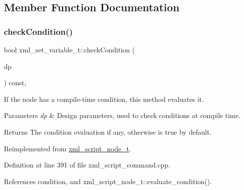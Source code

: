 \subsection{Member Function Documentation}
\mbox{\label{classxml__set__variable__t_a85442505ebbf8662f4791b94a52487d4}} 
\subsubsection{\texorpdfstring{check\+Condition()}{checkCondition()}}
{\footnotesize\ttfamily bool xml\+\_\+set\+\_\+variable\+\_\+t\+::check\+Condition (\begin{DoxyParamCaption}\item[{const \hyperlink{DesignParameters_8hpp_ae36bb1c4c9150d0eeecfe1f96f42d157}{Design\+Parameters\+Ref} \&}]{dp }\end{DoxyParamCaption}) const\hspace{0.3cm}{\ttfamily [override]}, {\ttfamily [virtual]}}



If the node has a compile-\/time condition, this method evaluates it. 


\begin{DoxyParams}{Parameters}
{\em dp} & Design parameters, used to check conditions at compile time. \\
\hline
\end{DoxyParams}
\begin{DoxyReturn}{Returns}
The condition evaluation if any, otherwise is true by default. 
\end{DoxyReturn}


Reimplemented from \hyperlink{classxml__script__node__t_a13fbe7caa7bed64ab3cc25d51392523d}{xml\+\_\+script\+\_\+node\+\_\+t}.



Definition at line 391 of file xml\+\_\+script\+\_\+command.\+cpp.



References condition, and xml\+\_\+script\+\_\+node\+\_\+t\+::evaluate\+\_\+condition().

